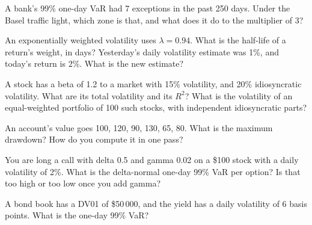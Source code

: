\begin{question}\label{iq:iv2:risk-validation-and-regulation:5}
A bank's 99\% one-day VaR had 7 exceptions in the past 250 days. Under the Basel traffic light, which zone is that, and what does it do to the multiplier of 3?
\end{question}

\begin{question}\label{iq:iv2:risk-validation-and-regulation:6}
An exponentially weighted volatility uses $\lambda = 0.94$. What is the half-life of a return's weight, in days? Yesterday's daily volatility estimate was 1\%, and today's return is 2\%. What is the new estimate?
\end{question}

\begin{question}\label{iq:iv2:risk-validation-and-regulation:7}
A stock has a beta of 1.2 to a market with 15\% volatility, and 20\% idiosyncratic volatility. What are its total volatility and its $R^2$? What is the volatility of an equal-weighted portfolio of 100 such stocks, with independent idiosyncratic parts?
\end{question}

\begin{question}\label{iq:iv2:risk-validation-and-regulation:8}
An account's value goes 100, 120, 90, 130, 65, 80. What is the maximum drawdown? How do you compute it in one pass?
\end{question}

\begin{question}\label{iq:iv2:risk-validation-and-regulation:9}
You are long a call with delta 0.5 and gamma 0.02 on a \$100 stock with a daily volatility of 2\%. What is the delta-normal one-day 99\% VaR per option? Is that too high or too low once you add gamma?
\end{question}

\begin{question}\label{iq:iv2:risk-validation-and-regulation:10}
A bond book has a DV01 of \$50\,000, and the yield has a daily volatility of 6 basis points. What is the one-day 99\% VaR?
\end{question}

